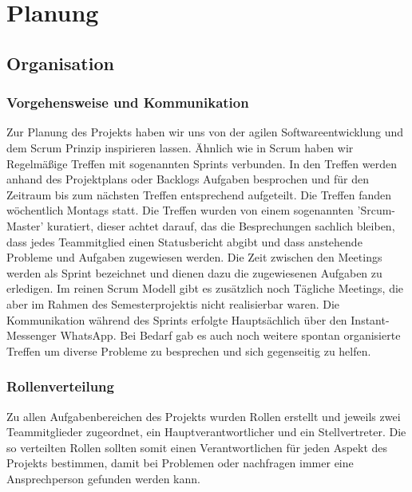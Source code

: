 \chapter{Planung}
\section{Organisation}
\subsection{Vorgehensweise und Kommunikation}
Zur Planung des Projekts haben wir uns von der agilen Softwareentwicklung und dem Scrum Prinzip inspirieren lassen. Ähnlich wie in Scrum haben wir Regelmäßige Treffen mit sogenannten Sprints verbunden. In den Treffen werden anhand des Projektplans oder Backlogs Aufgaben besprochen und für den Zeitraum bis zum nächsten Treffen entsprechend aufgeteilt. Die Treffen fanden wöchentlich Montags statt. Die Treffen wurden von einem sogenannten 'Srcum-Master' kuratiert, dieser achtet darauf, das die Besprechungen sachlich bleiben, dass jedes Teammitglied einen Statusbericht abgibt und dass anstehende Probleme und Aufgaben zugewiesen werden. Die Zeit zwischen den Meetings werden als Sprint bezeichnet und dienen dazu die zugewiesenen Aufgaben zu erledigen. Im reinen Scrum Modell gibt es zusätzlich noch Tägliche Meetings, die aber im Rahmen des Semesterprojektis nicht realisierbar waren. Die Kommunikation während des Sprints erfolgte Hauptsächlich über den Instant-Messenger WhatsApp. Bei Bedarf gab es auch noch weitere spontan organisierte Treffen um diverse Probleme zu besprechen und sich gegenseitig zu helfen. 

\subsection{Rollenverteilung}
Zu allen Aufgabenbereichen des Projekts wurden Rollen erstellt und jeweils zwei Teammitglieder zugeordnet, ein Hauptverantwortlicher und ein Stellvertreter. Die so verteilten Rollen sollten somit einen Verantwortlichen für jeden Aspekt des Projekts bestimmen, damit bei Problemen oder nachfragen immer eine Ansprechperson gefunden werden kann.

